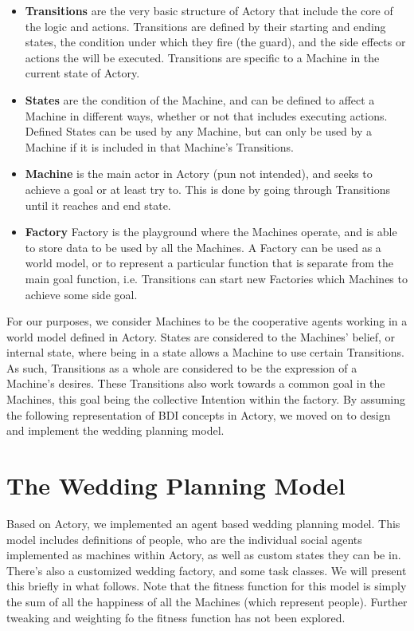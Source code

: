 \documentclass{sig-alternate}
\newcommand{\bi}{\begin{itemize}}
\newcommand{\ei}{\end{itemize}}
\begin{document}
\bi
\item \textbf{Transitions} are the very basic structure of Actory that include the core of the logic and actions. Transitions are defined by their starting and ending states, the condition under which they fire (the guard), and the side effects or actions the will be executed. Transitions are specific to a Machine in the current state of Actory.
\item \textbf{States} are the condition of the Machine, and can be defined to affect a Machine in different ways, whether or not that includes executing actions. Defined States can be used by any Machine, but can only be used by a Machine if it is included in that Machine's Transitions.
\item \textbf{Machine} is the main actor in Actory (pun not intended), and seeks to achieve a goal or at least try to. This is done by going through Transitions until it reaches and end state.
\item \textbf{Factory} Factory is the playground where the Machines operate, and is able to store data to be used by all the Machines. A Factory can be used as a world model, or to represent a particular function that is separate from the main goal function, i.e. Transitions can start new Factories which Machines to achieve some side goal.
\ei

For our purposes, we consider Machines to be the cooperative agents working in a world model defined in Actory. States are considered to the Machines' belief, or internal state, where being in a state allows a Machine to use certain Transitions. As such, Transitions as a whole are considered to be the expression of a Machine's desires. These Transitions also work towards a common goal in the Machines, this goal being the collective Intention within the factory. By assuming the following representation of BDI concepts in Actory, we moved on to design and implement the wedding planning model.

\section{The Wedding Planning Model}
Based on Actory, we implemented an agent based wedding planning model. This model includes definitions of people, who are the individual social agents implemented as machines within Actory, as well as custom states they can be in. There's also a customized wedding factory, and some task classes. We will present this briefly in what follows. Note that the fitness function for this model is simply the sum of all the happiness of all the Machines (which represent people). Further tweaking and weighting
fo the fitness function has not been explored.
\end{document}
